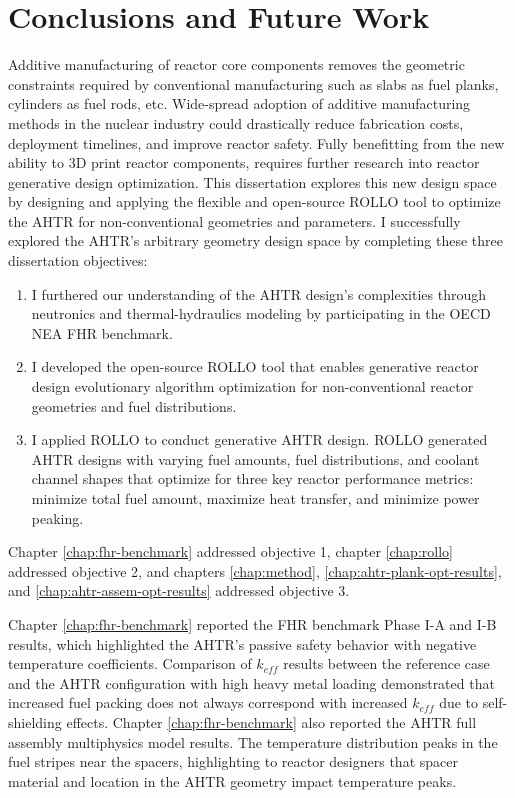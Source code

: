 \chapter{Conclusions and Future Work}
\glsresetall
\label{chap:concl}

Additive manufacturing of reactor core components removes the geometric constraints
required by conventional manufacturing such as slabs as fuel planks, cylinders as 
fuel rods, etc. 
Wide-spread adoption of additive manufacturing methods in the nuclear industry 
could drastically reduce fabrication costs, deployment timelines, and improve reactor 
safety. 
Fully benefitting from the new ability to 3D print reactor components, requires further 
research into reactor generative design optimization. 
This dissertation explores this new design space by designing and applying the flexible 
and open-source \gls{ROLLO} tool to optimize the \gls{AHTR} for non-conventional 
geometries and parameters. 
I successfully explored the \gls{AHTR}'s arbitrary geometry design space by completing 
these three dissertation objectives: 
\begin{enumerate}
    \item I furthered our understanding of the \gls{AHTR} design's complexities 
    through neutronics and thermal-hydraulics modeling by participating in the 
    \gls{OECD} \gls{NEA} \gls{FHR} benchmark.
    \item I developed the open-source \gls{ROLLO} tool that enables generative reactor 
    design evolutionary algorithm optimization for non-conventional reactor geometries 
    and fuel distributions.
    \item I applied \gls{ROLLO} to conduct generative \gls{AHTR} design.
    \gls{ROLLO} generated \gls{AHTR} designs with varying fuel amounts, fuel 
    distributions, and coolant channel shapes that optimize for three key reactor 
    performance metrics: minimize total fuel amount, maximize heat transfer, and 
    minimize power peaking.
\end{enumerate}
Chapter \ref{chap:fhr-benchmark} addressed objective 1, chapter \ref{chap:rollo} 
addressed objective 2, and chapters \ref{chap:method}, \ref{chap:ahtr-plank-opt-results}, 
and \ref{chap:ahtr-assem-opt-results} addressed objective 3. 

Chapter \ref{chap:fhr-benchmark} reported the \gls{FHR} benchmark Phase I-A and I-B 
results, which highlighted the \gls{AHTR}'s passive safety behavior with 
negative temperature coefficients. 
Comparison of $k_{eff}$ results between the reference case and the \gls{AHTR} 
configuration with high heavy metal loading demonstrated that increased fuel 
packing does not always correspond with increased $k_{eff}$ due to self-shielding 
effects.
Chapter \ref{chap:fhr-benchmark} also reported the \gls{AHTR} full assembly 
multiphysics model results. The temperature distribution peaks in the fuel stripes near 
the spacers, highlighting to reactor designers that spacer material and location in the 
\gls{AHTR} geometry impact temperature peaks.  

